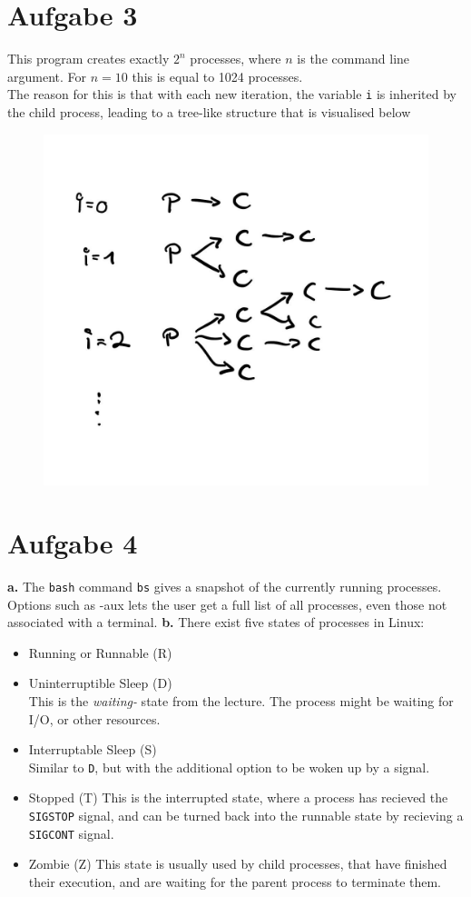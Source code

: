 \documentclass{article}
\begin{document}
\newpage

\section*{Aufgabe 3}
This program creates exactly \( 2 ^{n} \) processes, where \( n \) is the
command line argument. For \( n = 10 \) this is equal to 1024 processes.\\
The reason for this is that with each new iteration, the variable
\texttt{i} is inherited by the child process, leading to a tree-like
structure that is visualised below
\begin{figure}[H]
    \centering
    \includegraphics[width=.5\textwidth]{Fork.jpg}
\end{figure}
\section*{Aufgabe 4}
\textbf{a.} The \texttt{bash} command \texttt{bs} gives a snapshot of the currently
running processes. Options such as -aux lets the user get a full list of all
processes, even those not associated with a terminal.
\textbf{b.} There exist five states of processes in Linux:
\begin{itemize}
\item Running or Runnable (R)
\item Uninterruptible Sleep (D) \\ This is the \textit{waiting-} state 
    from the lecture. The process might be waiting for I/O, or other resources.
\item Interruptable Sleep (S) \\
    Similar to \texttt{D}, but with the additional option to be woken up by a
    signal.
\item Stopped (T)
    This is the interrupted state, where a process has recieved the
    \texttt{SIGSTOP} signal, and can be turned back into the runnable
    state by recieving a \texttt{SIGCONT} signal.
\item Zombie (Z)
    This state is usually used by child processes, that have finished their
    execution, and are waiting for the parent process to terminate them.
\end{itemize}
\newpage
\end{document}
